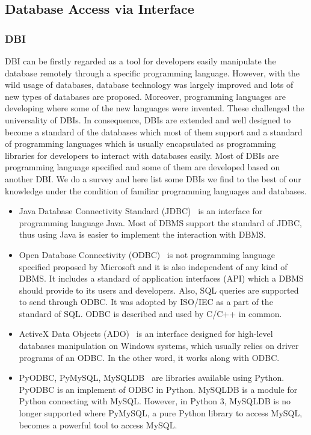\documentclass[onecolumn, conference, 12pt]{IEEEtran}
\begin{document}
	\subsection{Database Access via Interface}
	\subsubsection{DBI}
	DBI can be firstly regarded as a tool for developers easily manipulate the database remotely through a specific programming language. However, with the wild usage of databases, database technology was largely improved and lots of new types of databases are proposed. Moreover, programming languages are developing where some of the new languages were invented. These challenged the universality of DBIs. In consequence, DBIs are extended and well designed to become a standard of the databases which most of them support and a standard of programming languages which is usually encapsulated as programming libraries for developers to interact with databases easily. Most of DBIs are programming language specified and some of them are developed based on another DBI. We do a survey and here list some DBIs we find to the best of our knowledge under the condition of familiar programming languages and databases. 
	\begin{itemize}[]
		\item Java Database Connectivity Standard (JDBC)~\cite{JDBC} is an interface for programming language Java. Most of DBMS support the standard of JDBC, thus using Java is easier to implement the interaction with DBMS.
		\item Open Database Connectivity (ODBC)~\cite{ODBC} is not programming language specified proposed by Microsoft and it is also independent of any kind of DBMS. It includes a standard of application interfaces (API) which a DBMS should provide to its users and developers. Also, SQL queries are supported to send through ODBC. It was adopted by ISO/IEC as a part of the standard of SQL. ODBC is described and used by C/C++ in common.
		\item ActiveX Data Objects (ADO)~\cite{ADO} is an interface designed for high-level databases manipulation on Windows systems, which usually relies on driver programs of an ODBC. In the other word, it works along with ODBC.
		\item PyODBC, PyMySQL, MySQLDB~\cite{pyodbc,pymysql,mysqldb} are libraries available using Python. PyODBC is an implement of ODBC in Python. MySQLDB is a module for Python connecting with MySQL. However, in Python 3, MySQLDB is no longer supported where PyMySQL, a pure Python library to access MySQL, becomes a powerful tool to access MySQL.
	\end{itemize}
	
\end{document}
